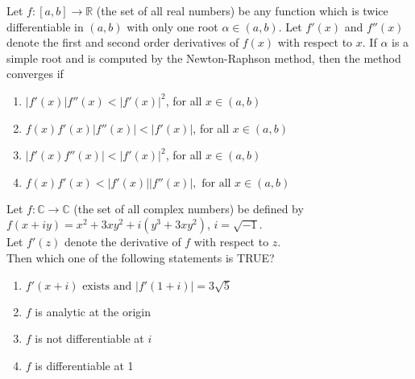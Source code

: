     \bigskip

    \item Let $ f : [a,b] \to \mathbb{R} $ (the set of all real numbers) be any function which is twice differentiable in $ (a,b) $ with only one root $ \alpha \in (a,b) $. Let $ f' (x) $ and $ f''(x) $ denote the first and second order derivatives of $ f(x) $ with respect to $ x $. If $ \alpha $ is a simple root and is computed by the Newton-Raphson method, then the method converges if\\
    \begin{enumerate}
        \item $ |f' (x)| f''(x) < |f'(x)|^2 $, for all $ x \in (a,b) $
        \item $ f(x) f' (x) |f''(x)| < |f'(x)|$, for all $ x \in (a,b) $
        \item $ |f'(x) f''(x)| < |f'(x)|^2 $, for all $ x \in (a,b) $
        \item $ f(x) f' (x) < |f'(x)| |f''(x)|, \text{ for all } x \in (a,b) $
    \end{enumerate}
    \bigskip

    \item Let $ f : \mathbb{C} \to \mathbb{C} $ (the set of all complex numbers) be defined by\\
    $ f(x + iy) = x^2 + 3xy^2 + i(y^3 + 3xy^2) $, $ i = \sqrt{-1} $.\\
    Let $ f'(z) $ denote the derivative of $ f $ with respect to $ z $.\\
    Then which one of the following statements is TRUE?\\
    \begin{enumerate}
        \item $ f'(x + i) \text{ exists and } |f'(1+i)| = 3\sqrt{5} $
        \item $ f $ is analytic at the origin
        \item $ f $ is not differentiable at $ i $
        \item $ f $ is differentiable at 1
    \end{enumerate}
    \bigskip

    
